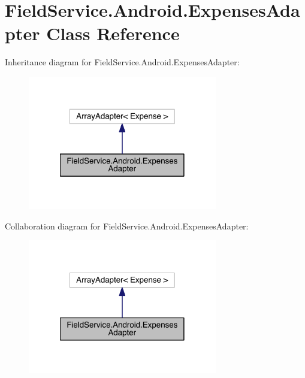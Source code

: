 \hypertarget{class_field_service_1_1_android_1_1_expenses_adapter}{\section{Field\+Service.\+Android.\+Expenses\+Adapter Class Reference}
\label{class_field_service_1_1_android_1_1_expenses_adapter}
}


Inheritance diagram for Field\+Service.\+Android.\+Expenses\+Adapter\+:
\nopagebreak
\begin{figure}[H]
\begin{center}
\leavevmode
\includegraphics[width=234pt]{class_field_service_1_1_android_1_1_expenses_adapter__inherit__graph}
\end{center}
\end{figure}


Collaboration diagram for Field\+Service.\+Android.\+Expenses\+Adapter\+:
\nopagebreak
\begin{figure}[H]
\begin{center}
\leavevmode
\includegraphics[width=234pt]{class_field_service_1_1_android_1_1_expenses_adapter__coll__graph}
\end{center}
\end{figure}
